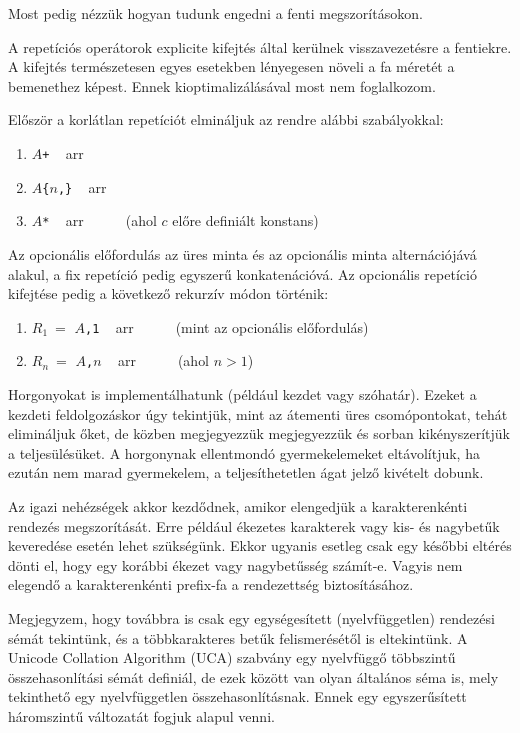\documentclass[
    parspace,
    noindent,
    nohyp,
]{elteiktdk}[2023/04/10]
\begin{document}
Most pedig nézzük hogyan tudunk engedni a fenti megszorításokon.

A repetíciós operátorok explicite kifejtés által kerülnek visszavezetésre a fentiekre.
A kifejtés természetesen egyes esetekben lényegesen növeli a fa méretét a bemenethez képest.
Ennek kioptimalizálásával most nem foglalkozom.

Először a korlátlan repetíciót elmináljuk az rendre alábbi szabályokkal:

\begin{enumerate}
    \item \texttt{$A$+} ~ arr ~ 
    \item \texttt{$A$\{$n$,\}} ~ arr ~ 
    \item \texttt{$A$*} ~ arr ~  ~~~ (ahol $c$ előre definiált konstans)
\end{enumerate}

Az opcionális előfordulás az üres minta és az opcionális minta alternációjává alakul,
a fix repetíció pedig egyszerű konkatenációvá.
Az opcionális repetíció kifejtése pedig a következő rekurzív módon történik:

\begin{enumerate}
    \item $R_1~=$ \texttt{$A${,1}} ~ arr ~  ~~~ (mint az opcionális előfordulás)
    \item $R_n~=$ \texttt{$A${,$n$}} ~ arr ~  ~~~ (ahol $n>1$)
\end{enumerate}

Horgonyokat is implementálhatunk (például kezdet vagy szóhatár).
Ezeket a kezdeti feldolgozáskor úgy tekintjük,
mint az átementi üres csomópontokat, tehát elimináljuk őket,
de közben megjegyezzük megjegyezzük és sorban kikényszerítjük a teljesülésüket.
A horgonynak ellentmondó gyermekelemeket eltávolítjuk,
ha ezután nem marad gyermekelem, a teljesíthetetlen ágat jelző kivételt dobunk.


Az igazi nehézségek akkor kezdődnek,
amikor elengedjük a karakterenkénti rendezés megszorítását.
Erre például ékezetes karakterek vagy kis- és nagybetűk keveredése esetén lehet szükségünk.
Ekkor ugyanis esetleg csak egy későbbi eltérés dönti el,
hogy egy korábbi ékezet vagy nagybetűsség számít-e.
Vagyis nem elegendő a karakterenkénti prefix-fa a rendezettség biztosításához.

Megjegyzem, hogy továbbra is csak egy egységesített (nyelvfüggetlen) rendezési sémát tekintünk,
és a többkarakteres betűk felismerésétől is eltekintünk.
A Unicode Collation Algorithm (UCA) szabvány egy nyelvfüggő többszintű összehasonlítási sémát definiál,
de ezek között van olyan általános séma is, mely tekinthető egy nyelvfüggetlen összehasonlításnak.
Ennek egy egyszerűsített háromszintű változatát fogjuk alapul venni.
\end{document}

